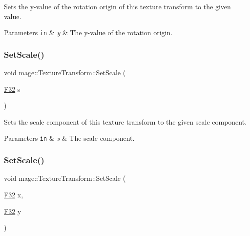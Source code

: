 Sets the y-\/value of the rotation origin of this texture transform to the given value.


\begin{DoxyParams}[1]{Parameters}
\mbox{\tt in}  & {\em y} & The y-\/value of the rotation origin. \\
\hline
\end{DoxyParams}
\mbox{\label{classmage_1_1_texture_transform_aee6f84fbb4b7d57931aab72b6cec5b6c}} 
\subsubsection{\texorpdfstring{Set\+Scale()}{SetScale()}\hspace{0.1cm}{\footnotesize\ttfamily [1/4]}}
{\footnotesize\ttfamily void mage\+::\+Texture\+Transform\+::\+Set\+Scale (\begin{DoxyParamCaption}\item[{\mbox{\hyperlink{namespacemage_aa97e833b45f06d60a0a9c4fc22ae02c0}{F32}}}]{s }\end{DoxyParamCaption})\hspace{0.3cm}{\ttfamily [noexcept]}}

Sets the scale component of this texture transform to the given scale component.


\begin{DoxyParams}[1]{Parameters}
\mbox{\tt in}  & {\em s} & The scale component. \\
\hline
\end{DoxyParams}
\mbox{\label{classmage_1_1_texture_transform_ac3af8885cf4b4c6ad97138bbaf12cda1}} 
\subsubsection{\texorpdfstring{Set\+Scale()}{SetScale()}\hspace{0.1cm}{\footnotesize\ttfamily [2/4]}}
{\footnotesize\ttfamily void mage\+::\+Texture\+Transform\+::\+Set\+Scale (\begin{DoxyParamCaption}\item[{\mbox{\hyperlink{namespacemage_aa97e833b45f06d60a0a9c4fc22ae02c0}{F32}}}]{x,  }\item[{\mbox{\hyperlink{namespacemage_aa97e833b45f06d60a0a9c4fc22ae02c0}{F32}}}]{y }\end{DoxyParamCaption})\hspace{0.3cm}{\ttfamily [noexcept]}}

